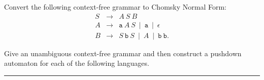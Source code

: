 \documentclass[a4page]{exam}
\newcommand{\Str}[1]{\mathtt{#1}}
\begin{document}
\begin{questions}
\question[10] Convert the following context-free grammar to Chomsky Normal Form:
  \begin{eqnarray*}
    S &\rightarrow& A\ S\ B\\
    A &\rightarrow& \Str{a}\ A\ S\ \mid\  \Str{a}\ \mid\ \epsilon \\
    B &\rightarrow& S\ \Str{b}\ S\ \mid\ A\ \mid\ \Str{b}\ \Str{b}.
  \end{eqnarray*}

\question Give an unambiguous context-free grammar and then construct a pushdown automaton for each of the following languages.
  
\end{questions}

\noindent\rule{\textwidth}{1pt}\\\vspace{1pt}
\end{document}
